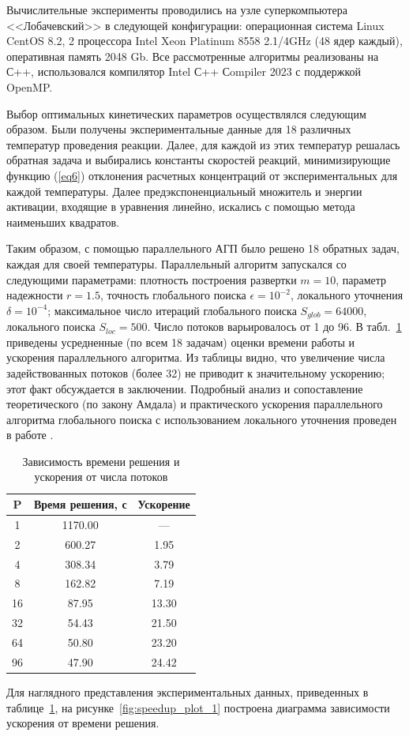 \documentclass{cmi}
\begin{document}
Вычислительные эксперименты проводились на узле суперкомпьютера <<Лобачевский>> в следующей конфигурации: операционная система Linux CentOS 8.2, 2 процессора Intel Xeon Platinum 8558 2.1/4GHz (48 ядер каждый), оперативная память 2048 Gb. 
Все рассмотренные алгоритмы реализованы на С++, использовался компилятор Intel С++ Сompiler 2023 с поддержкой OpenMP.

Выбор оптимальных кинетических параметров осуществлялся следующим образом. Были получены экспериментальные данные для 18 различных температур проведения реакции. Далее, для каждой из этих температур решалась обратная задача и выбирались константы скоростей реакций, минимизирующие функцию (\ref{eq6}) отклонения расчетных концентраций от экспериментальных для каждой температуры. Далее предэкспоненциальный множитель и энергии активации, входящие в уравнения линейно, искались с помощью метода наименьших квадратов.

Таким образом, с помощью параллельного АГП было решено 18 обратных задач, каждая для своей температуры.
Параллельный алгоритм запускался со следующими параметрами: плотность построения развертки $m=10$, параметр надежности $r=1.5$, точность глобального поиска $\epsilon = 10^{-2}$, локального уточнения $\delta = 10^{-4}$; максимальное число итераций глобального поиска $S_{glob} = 64 000$, локального поиска $S_{loc} = 500$. Число потоков варьировалось от 1 до 96.
В табл.~\ref{tab:scalability} приведены усредненные (по всем 18 задачам) оценки времени работы и ускорения параллельного алгоритма. Из таблицы видно, что увеличение числа задействованных потоков (более 32) не приводит к значительному ускорению; этот факт обсуждается в заключении.
Подробный анализ и сопоставление теоретического (по закону Амдала) и практического ускорения параллельного алгоритма глобального поиска с использованием локального уточнения проведен в работе \cite{Lebedev2022}.

\begin{table}[h]
\noindent
\caption{Зависимость времени решения и ускорения от числа потоков}
\label{tab:scalability}
\centering
\begin{tabular}{|c|c|c|}
\hline
\textbf{P} & \textbf{Время решения, с} & \textbf{Ускорение} \\
\hline
1   & 1170.00  & --- \\
2   & 600.27  & 1.95 \\
4   & 308.34  & 3.79 \\
8   & 162.82  & 7.19 \\
16  & 87.95   & 13.30 \\
32  & 54.43   & 21.50 \\
64  & 50.80   & 23.20 \\
96  & 47.90   & 24.42 \\
\hline
\end{tabular}
\end{table}
Для наглядного представления экспериментальных данных, приведенных в таблице~\ref{tab:scalability}, на рисунке~\ref{fig:speedup_plot_1} построена диаграмма зависимости ускорения от времени решения. 
\end{document}
